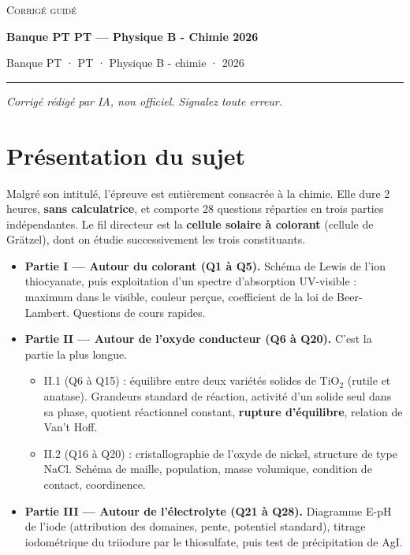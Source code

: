 \documentclass[11pt,a4paper]{article}
\providecommand{\tightlist}{\setlength{\itemsep}{0pt}\setlength{\parskip}{0pt}}
\begin{document}
\thispagestyle{plain}
\begin{center}
  {\small\scshape Corrigé guidé}\par\smallskip
  {\LARGE\bfseries Banque PT PT — Physique B - Chimie 2026\par}\medskip
  {\large Banque PT · PT · Physique B - chimie · 2026\par}
\end{center}
\vspace{2pt}\hrule\vspace{8pt}

\emph{Corrigé rédigé par IA, non officiel. Signalez toute erreur.}

\hypertarget{pruxe9sentation-du-sujet}{%
\section{Présentation du sujet}\label{pruxe9sentation-du-sujet}}

Malgré son intitulé, l'épreuve est entièrement consacrée à la chimie. Elle dure 2 heures, \textbf{sans calculatrice}, et comporte 28 questions réparties en trois parties indépendantes. Le fil directeur est la \textbf{cellule solaire à colorant} (cellule de Grätzel), dont on étudie successivement les trois constituants.

\begin{itemize}
\tightlist
\item
  \textbf{Partie I --- Autour du colorant (Q1 à Q5).} Schéma de Lewis de l'ion thiocyanate, puis exploitation d'un spectre d'absorption UV-visible : maximum dans le visible, couleur perçue, coefficient de la loi de Beer-Lambert. Questions de cours rapides.
\item
  \textbf{Partie II --- Autour de l'oxyde conducteur (Q6 à Q20).} C'est la partie la plus longue.

  \begin{itemize}
  \tightlist
  \item
    II.1 (Q6 à Q15) : équilibre entre deux variétés solides de \(\mathrm{TiO_2}\) (rutile et anatase). Grandeurs standard de réaction, activité d'un solide seul dans sa phase, quotient réactionnel constant, \textbf{rupture d'équilibre}, relation de Van't Hoff.
  \item
    II.2 (Q16 à Q20) : cristallographie de l'oxyde de nickel, structure de type NaCl. Schéma de maille, population, masse volumique, condition de contact, coordinence.
  \end{itemize}
\item
  \textbf{Partie III --- Autour de l'électrolyte (Q21 à Q28).} Diagramme E-pH de l'iode (attribution des domaines, pente, potentiel standard), titrage iodométrique du triiodure par le thiosulfate, puis test de précipitation de AgI.
\end{itemize}
\end{document}
